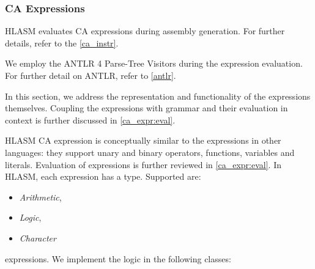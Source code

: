 \subsubsection{CA Expressions}
\label{ca_expr:logic}
HLASM evaluates CA expressions during assembly generation. For further details, refer to the \cref{ca_instr}.

We employ the ANTLR 4 Parse-Tree Visitors during the expression evaluation. For further detail on ANTLR, refer to \cref{antlr}.

In this section, we address the representation and functionality of the expressions themselves. Coupling the expressions with grammar and their evaluation in context is further discussed in \cref{ca_expr:eval}.

HLASM CA expression is conceptually similar to the expressions in other languages: they support unary and binary operators, functions, variables and literals. Evaluation of expressions is further reviewed in \cref{ca_expr:eval}. In HLASM, each expression has a type. Supported are:

\begin{itemize}
	\item  \emph{Arithmetic},
	\item  \emph{Logic},
	\item  \emph{Character}
\end{itemize}

expressions. We implement the logic in the following classes:

